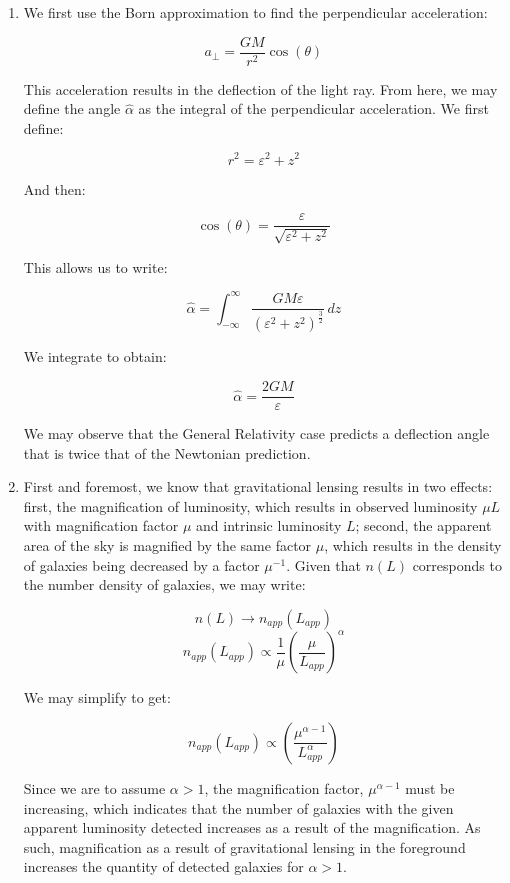 \begin{enumerate}
\begin{enumerate}
    \end{enumerate}

  \item We first use the Born approximation to find the perpendicular acceleration:

    $$a_{\perp}=\frac{GM}{r^2}\cos(\theta)$$

    This acceleration results in the deflection of the light ray. From here, we may define the angle $\hat{\alpha}$ as the integral of the perpendicular acceleration. We first define:

    $$r^2=\varepsilon^2+z^2$$

    And then:

    $$\cos(\theta)=\frac{\varepsilon}{\sqrt{\varepsilon^2+z^2}}$$

    This allows us to write:

    $$\hat{\alpha}=\int_{-\infty}^{\infty} \frac{GM\varepsilon}{(\varepsilon^2+z^2)^{\frac{3}{2}}}\,dz$$

    We integrate to obtain:

    $$\boxed{\hat{\alpha}=\frac{2GM}{\varepsilon}}$$

    We may observe that the General Relativity case predicts a deflection angle that is twice that of the Newtonian prediction.

  \item First and foremost, we know that gravitational lensing results in two effects: first, the magnification of luminosity, which results in observed luminosity $\mu L$ with magnification factor $\mu$ and intrinsic luminosity $L$; second, the apparent area of the sky is magnified by the same factor $\mu$, which results in the density of galaxies being decreased by a factor $\mu^{-1}$. Given that $n(L)$ corresponds to the number density of galaxies, we may write:

    $$n(L)\to n_{app}(L_{app})$$
    $$n_{app}(L_{app})\propto \frac{1}{\mu}\left( \frac{\mu}{L_{app}} \right)^{\alpha}$$

    We may simplify to get:

    $$n_{app}(L_{app})\propto \left( \frac{\mu^{\alpha-1}}{L_{app}^{\alpha}} \right)$$

    Since we are to assume $\alpha>1$, the magnification factor, $\mu^{\alpha-1}$ must be increasing, which indicates that the number of galaxies with the given apparent luminosity detected increases as a result of the magnification. As such, magnification as a result of gravitational lensing in the foreground increases the quantity of detected galaxies for $\alpha>1$.


\end{enumerate}
